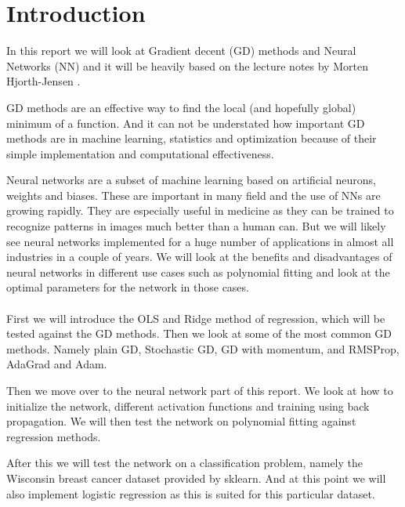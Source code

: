 \section{Introduction}


\begin{comment}
    In this report we will look at ...
    Motivate the reader, the first part of the introduction gives always a
    motivation and tries to give the overarching ideas. What I have done. 
    The structure of the report, how it is organised. Explain structure of the rapport at the end of intro. 
\end{comment}

In this report we will look at Gradient decent (GD) methods and Neural Networks
(NN) and it will be heavily based on the lecture notes by Morten Hjorth-Jensen
\cite{w41}.

GD methods are an effective way to find the local (and hopefully global)
minimum of a function. And it can not be understated how important GD methods
are in machine learning, statistics and optimization because of their simple
implementation and computational effectiveness.

Neural networks are a subset of machine learning based on artificial neurons,
weights and biases. These are important in many field and the use of NNs
are growing rapidly. They are especially useful in medicine as they can be
trained to recognize patterns in images much better than a human can. But we
will likely see neural networks implemented for a huge number of applications
in almost all industries in a couple of years. We will look at the benefits and
disadvantages of neural networks in different use cases such as polynomial
fitting and look at the optimal parameters for the network in those cases.
\\~\\
First we will introduce the OLS and Ridge method of regression, which will be
tested against the GD methods. Then we look at some of the most common GD methods. Namely plain
GD, Stochastic GD, GD with momentum, and RMSProp, AdaGrad and Adam. 

Then we move over to the neural network part of this report. We look at how to
initialize the network, different activation functions and
training using back propagation. We will then test the network on polynomial
fitting against regression methods.

After this we will test the network on a classification problem, namely
the Wisconsin breast cancer dataset provided by sklearn. And at this point we
will also implement logistic regression as this is suited for this particular
dataset. 

